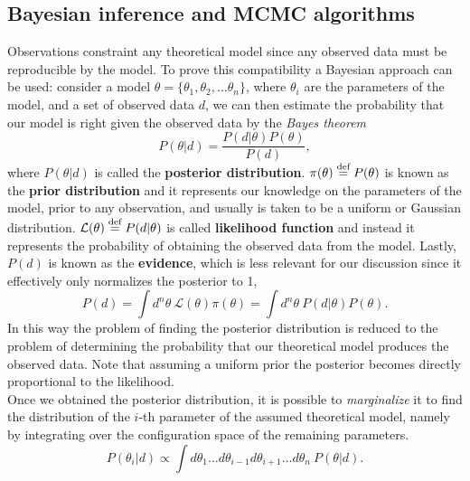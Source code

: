 \subsection{Bayesian inference and MCMC algorithms}
Observations constraint any theoretical model since any observed data must be reproducible by the model. To prove this compatibility a Bayesian approach can be used: consider a model $\theta=\{\theta_1,\theta_2,\dots\theta_n\}$, where $\theta_i$ are the parameters of the model, and a set of observed data $d$, we can then estimate the probability that our model is right given the observed data by the \emph{Bayes theorem}
\begin{equation}
    P(\theta|d)=\frac{P(d|\theta)P(\theta)}{P(d)},
\end{equation}
where $P(\theta|d)$ is called the \textbf{posterior distribution}. $\pi(\theta)\stackrel{\text{def}}{=} P(\theta)$ is known as the \textbf{prior distribution} and it represents our knowledge on the parameters of the model, prior to any observation, and usually is taken to be a uniform or Gaussian distribution.  $\mathcal{L}(\theta)\stackrel{\text{def}}{=} P(d|\theta)$ is called \textbf{likelihood function} and instead it represents the probability of obtaining the observed data from the model. Lastly, $P(d)$ is known as the \textbf{evidence}, which is less relevant for our discussion since it effectively only normalizes the posterior to 1, 
$$P(d)=\int d^n\theta\ \mathcal{L}(\theta)\pi(\theta)=\int d^n\theta\ P(d|\theta)P(\theta).$$
In this way the problem of finding the posterior distribution is reduced to the problem of determining the probability that our theoretical model produces the observed data. Note that assuming a uniform prior the posterior becomes directly proportional to the likelihood.\\ 
Once we obtained the posterior distribution, it is possible to \emph{marginalize} it to find the distribution of the $i$-th parameter of the assumed theoretical model, namely by integrating over the configuration space of the remaining parameters.
$$P(\theta_i|d)\propto\int d\theta_1\dots d\theta_{i-1}d\theta_{i+1}\dots d\theta_n\ P(\theta|d). $$

